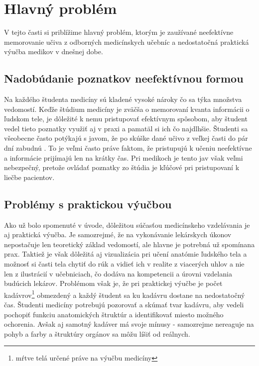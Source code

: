 \documentclass[10pt,twoside,slovak,a4paper]{article}
\begin{document}
\section{Hlavný problém} \label{prvacast}
V tejto časti si priblížime hlavný problém, ktorým je zaužívané neefektívne memorovanie učiva z odborných medicínskych učebníc a nedostatočná praktická výučba medikov v dnešnej dobe. 

\subsection{Nadobúdanie poznatkov neefektívnou formou} \label{prvacast:sub1} 
Na každého študenta medicíny sú kladené vysoké nároky čo sa týka množstva vedomostí. Keďže štúdium medicíny je zväčša o memorovaní kvanta informácii o ľudskom tele, je dôležité k nemu pristupovať efektívnym spôsobom, aby študent vedel tieto poznatky využiť aj v praxi a pamatäl si ich čo najdlhšie. Študenti sa všeobecne často potýkajú s javom, že po skúške dané učivo z veľkej časti do pár dní zabudnú \cite{JimmyLIforget}. To je veľmi často práve faktom, že pristupujú k učeniu neefektívne a informácie prijímajú len na krátky čas. Pri medikoch je tento jav však veľmi nebezpečný, pretože ovládať poznatky zo štúdia je kľúčové pri pristupovaní k liečbe pacientov.

\subsection{Problémy s praktickou výučbou} \label{prvacast:sub2} 
Ako už bolo spomenuté v úvode, dôležitou súčasťou medicínskeho vzdelávania je aj praktická výučba. Je samozrejmé, že na vykonávanie lekárskych úkonov nepostačuje len teoretický základ vedomostí, ale hlavne je potrebná už spomínana prax. Taktiež je však dôležitá aj vizualizácia pri učení anatómie ľudského tela a možnosť si časti tela chytiť do rúk a vidieť ich v realite z viacerých uhlov a nie len z ilustrácií v učebniciach, čo dodáva na kompetencii a úrovni vzdelania budúcich lekárov. Problémom však je, že pri praktickej výučbe je počet kadávrov\footnote{mŕtve telá určené práve na výučbu medicíny} obmezdený a každý študent sa ku kadávru dostane na nedostatočný čas. Študenti medicíny potrebujú pozorovať a skúmať tvar kadávru, aby vedeli pochopiť funkciu anatomických štruktúr a identifikovať miesto možného ochorenia. Avšak aj samotný kadáver má svoje mínusy - samozrejme nereaguje na pohyb a farby a štruktúry orgánov sa môžu líšiť od reálnych.\cite{9611852}
\end{document}
